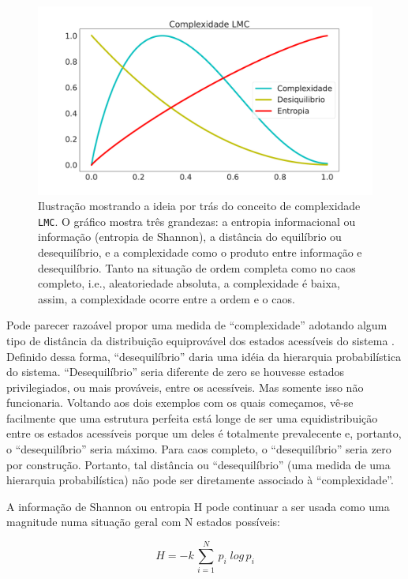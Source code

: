 \documentclass[
	12pt,				%
	openany,oneside,
	a4paper,			%
	english,			%
	brazil,				%
	]{abntex2}
\begin{document}
\begin{figure}
\includegraphics[width=.9\textwidth]{lmc}
\caption{\label{fig2}Ilustração mostrando a ideia por trás do conceito de complexidade \texttt{LMC}. O gráfico mostra três grandezas: a entropia informacional ou informação (entropia de Shannon), a distância do equilíbrio ou desequilíbrio, e a complexidade como o produto entre informação e desequilíbrio. Tanto na situação de ordem completa como no caos completo, i.e., aleatoriedade absoluta, a complexidade é baixa, assim, a complexidade ocorre entre a ordem e o caos.}
\end{figure}


Pode parecer razoável propor uma medida de “complexidade” adotando algum tipo de distância da distribuição equiprovável dos estados acessíveis do sistema \cite{c4}. Definido dessa forma, “desequilíbrio” daria uma idéia da hierarquia probabilística do sistema. “Desequilíbrio” seria diferente de zero se houvesse estados privilegiados, ou mais prováveis, entre os acessíveis. Mas somente isso não funcionaria. Voltando aos dois exemplos com os quais começamos, vê-se facilmente que uma estrutura perfeita está longe de ser uma equidistribuição entre os estados acessíveis porque um deles é totalmente prevalecente e, portanto, o “desequilíbrio” seria máximo. Para caos completo, o “desequilíbrio” seria zero por construção. Portanto, tal distância ou “desequilíbrio” (uma medida de uma hierarquia probabilística) não pode ser diretamente associado à “complexidade”.

A informação de Shannon ou entropia H pode continuar a ser usada como uma magnitude numa situação geral com N estados possíveis:

\begin{equation}
H = -k \, \sum^N_{i=1} \, p_i  \; log \, p_i
\end{equation}
\end{document}
